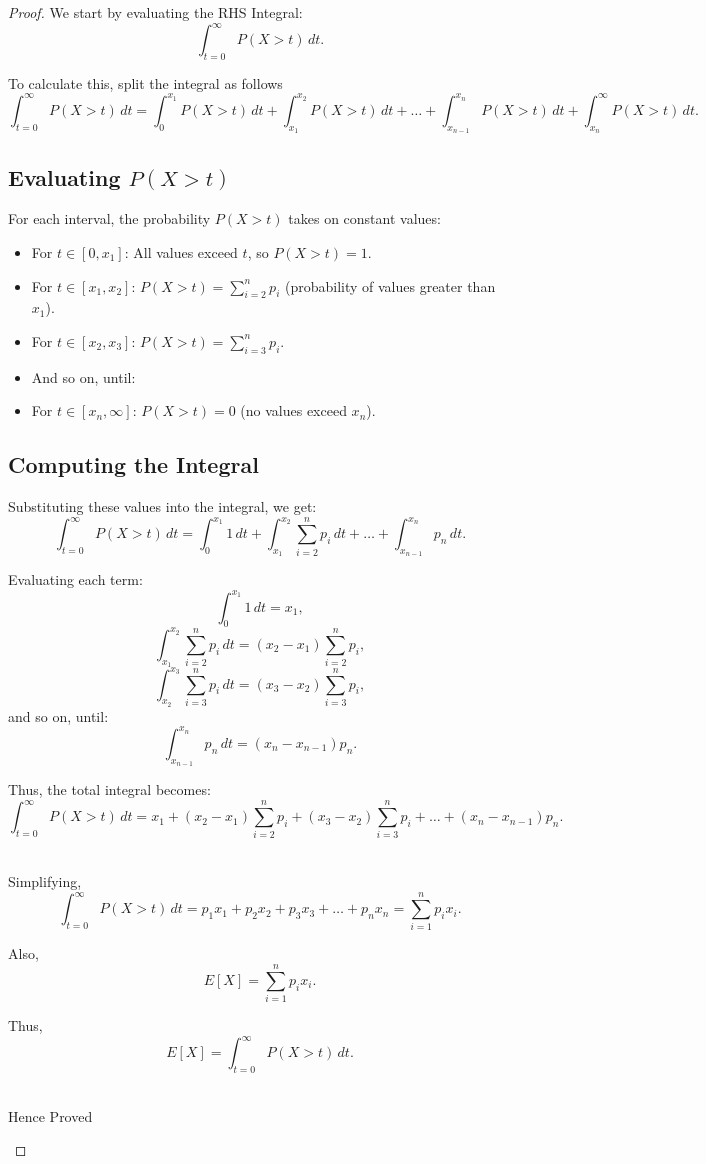 \documentclass[12pt]{article}
\begin{document}
\begin{proof}
We start by evaluating the RHS Integral:
\[
\int_{t=0}^{\infty} P(X > t) \, dt.
\]

To calculate this, split the integral as follows
\[
\int_{t=0}^{\infty} P(X > t) \, dt = \int_{0}^{x_1} P(X > t) \, dt + \int_{x_1}^{x_2} P(X > t) \, dt + \dots + \int_{x_{n-1}}^{x_n} P(X > t) \, dt + \int_{x_n}^{\infty} P(X > t) \, dt.
\]

\subsection*{Evaluating \( P(X > t) \)}
For each interval, the probability \( P(X > t) \) takes on constant values:
\begin{itemize}
    \item For \( t \in [0, x_1] \): All values exceed \( t \), so \( P(X > t) = 1 \).
    \item For \( t \in [x_1, x_2] \): \( P(X > t) = \sum_{i=2}^n p_i \) (probability of values greater than \( x_1 \)).
    \item For \( t \in [x_2, x_3] \): \( P(X > t) = \sum_{i=3}^n p_i \).
    \item And so on, until:
    \item For \( t \in [x_n, \infty] \): \( P(X > t) = 0 \) (no values exceed \( x_n \)).
\end{itemize}
\subsection*{Computing the Integral}
Substituting these values into the integral, we get:
\[
\int_{t=0}^{\infty} P(X > t) \, dt = \int_{0}^{x_1} 1 \, dt + \int_{x_1}^{x_2} \sum_{i=2}^n p_i \, dt + \dots + \int_{x_{n-1}}^{x_n} p_n \, dt.
\]

Evaluating each term:
\[
\int_{0}^{x_1} 1 \, dt = x_1,
\]
\[
\int_{x_1}^{x_2} \sum_{i=2}^n p_i \, dt = (x_2 - x_1) \sum_{i=2}^n p_i,
\]
\[
\int_{x_2}^{x_3} \sum_{i=3}^n p_i \, dt = (x_3 - x_2) \sum_{i=3}^n p_i,
\]
and so on, until:
\[
\int_{x_{n-1}}^{x_n} p_n \, dt = (x_n - x_{n-1}) p_n.
\]

Thus, the total integral becomes:
\[
\int_{t=0}^{\infty} P(X > t) \, dt = x_1 + (x_2 - x_1) \sum_{i=2}^n p_i + (x_3 - x_2) \sum_{i=3}^n p_i + \dots + (x_n - x_{n-1}) p_n.
\]

\\
Simplifying, 
\[
\int_{t=0}^{\infty} P(X > t) \, dt = p_1 x_1 + p_2 x_2 + p_3 x_3 + \dots + p_n x_n = \sum_{i=1}^n p_i x_i.
\]

Also, 
\[
E[X] = \sum_{i=1}^n p_i x_i.
\]

Thus,
\[
E[X] = \int_{t=0}^{\infty} P(X > t) \, dt.
\]

\begin{center}
\\Hence Proved
\end{center}


\end{proof}
\end{document}

